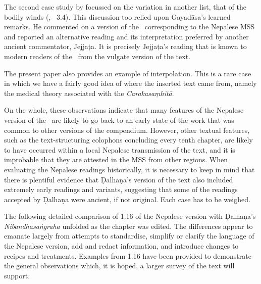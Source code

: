 The second case study by \citet{kleb-2021b} focussed on the variation in another
list, that of the bodily winds (, \SS\ 3.4).
This  discussion  too relied upon Gayadāsa's learned remarks. 
He commented on a version of the \SS\ corresponding to the Nepalese MSS 
and reported an alternative reading and its interpretation preferred
by another ancient commentator, Jejjaṭa.  It is precisely 
Jejjaṭa's reading that is known to modern
readers of the \SS\ from the vulgate version of the text. 

The present paper also provides an example of
interpolation.  This is a rare case in which we have a fairly good idea of where
the inserted text came from, namely the medical theory associated with the
\emph{Carakasaṃhitā}.


On the whole, these observations indicate that many features of the Nepalese version of the 
\SS\ are likely to go back to an early state of the work that was common to other versions of 
the compendium. 
However, other textual features, such as the text-structuring colophons concluding every 
tenth chapter, are likely to have occurred within a local Nepalese transmission of the text, 
and it is improbable that they are attested in the MSS from other regions. 
When evaluating the Nepalese readings historically, it is necessary to keep in mind that there 
is plentiful evidence that Ḍalhaṇa's version of the text also included extremely early 
readings and variants, suggesting that some of the readings accepted by Ḍalhaṇa were 
ancient, if not original.  Each case has to be weighed. 


The following detailed comparison of 1.16 of the Nepalese version with Ḍalhaṇa's 
\emph{Nibandhasaṅgraha} unfolded as the chapter was edited. The differences appear to 
emanate largely from attempts to standardise, simplify or clarify the language of the 
Nepalese version, add and redact information, and introduce changes to recipes and 
treatments. Examples from 1.16 have been provided to demonstrate the general 
observations which, it is hoped, a larger survey of the text will support.


